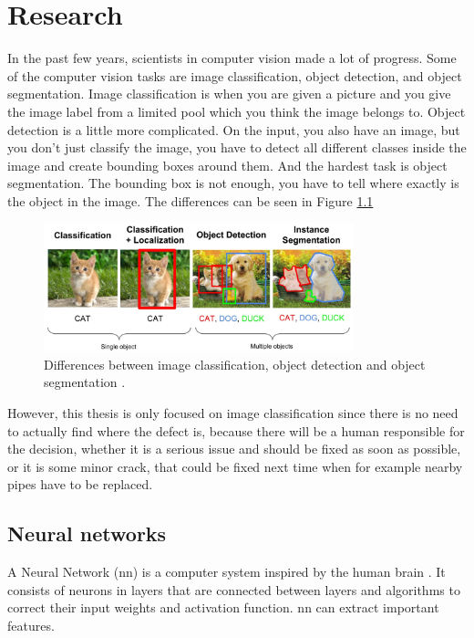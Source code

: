 \documentclass[thesis=B,english]{FITthesis}[2019/12/23]
\begin{document}
\chapter{Research}
In the past few years, scientists in computer vision made a lot of progress. Some of the computer vision tasks are image classification, object detection, and object segmentation. Image classification is when you are given a picture and you give the image label from a limited pool which you think the image belongs to. Object detection is a little more complicated. On the input, you also have an image, but you don't just classify the image, you have to detect all different classes inside the image and create bounding boxes around them. And the hardest task is object segmentation. The bounding box is not enough, you have to tell where exactly is the object in the image. The differences can be seen in Figure \ref{fig:cv_topics}

\begin{figure}
    \centering
    \includegraphics[width=0.8\textwidth]{cv_differences.jpeg}
    \caption[Image classification, object detection and instance segmentation]{Differences between image classification, object detection and object segmentation \cite{ouaknine_2018}.}
    \label{fig:cv_topics}
\end{figure}

However, this thesis is only focused on image classification since there is no need to actually find where the defect is, because there will be a human responsible for the decision, whether it is a serious issue and should be fixed as soon as possible, or it is some minor crack, that could be fixed next time when for example nearby pipes have to be replaced.

\section{Neural networks}
A Neural Network (\gls{nn}) is a computer system inspired by the human brain \cite{bengio2017deep}. It consists of neurons in layers that are connected between layers and algorithms to correct their input weights and activation function. \Gls{nn} can extract important features. 
\end{document}
